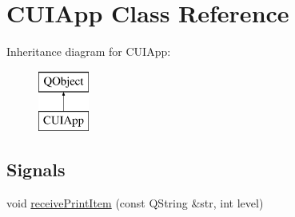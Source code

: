 \hypertarget{classCUIApp}{\section{C\-U\-I\-App Class Reference}
\label{classCUIApp}
}
Inheritance diagram for C\-U\-I\-App\-:\begin{figure}[H]
\begin{center}
\leavevmode
\includegraphics[height=2.000000cm]{classCUIApp}
\end{center}
\end{figure}
\subsection*{Signals}
\begin{DoxyCompactItemize}
\item 
void \hyperlink{classCUIApp_a9324e3388ce7ccfb3ec6b0862d61aa52}{receive\-Print\-Item} (const Q\-String \&str, int level)
\end{DoxyCompactItemize}
